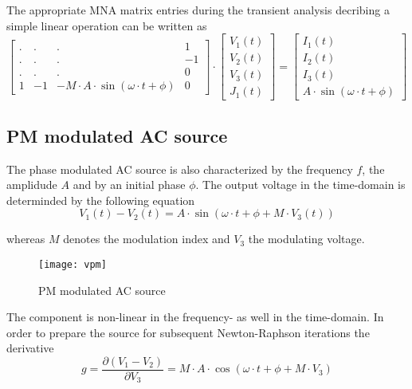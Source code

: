 The appropriate MNA matrix entries during the transient analysis
decribing a simple linear operation can be written as
\begin{equation}
\begin{bmatrix}
. & . & . & 1\\
. & . & . & -1\\
. & . & . & 0\\
1 & -1 & -M\cdot A\cdot \sin{\left(\omega\cdot t + \phi\right)} & 0
\end{bmatrix}
\cdot
\begin{bmatrix}
V_1\left(t\right)\\
V_2\left(t\right)\\
V_3\left(t\right)\\
J_1\left(t\right)
\end{bmatrix}
=
\begin{bmatrix}
I_1\left(t\right)\\
I_2\left(t\right)\\
I_3\left(t\right)\\
A\cdot \sin{\left(\omega\cdot t + \phi\right)}
\end{bmatrix}
\end{equation}

\subsection{PM modulated AC source}

The phase modulated AC source is also characterized by the frequency
$f$, the amplidude $A$ and by an initial phase $\phi$.  The output
voltage in the time-domain is determinded by the following equation
\begin{equation}
V_1\left(t\right) - V_2\left(t\right) = A\cdot\sin{\left(\omega\cdot t + \phi + M\cdot V_3\left(t\right)\right)}
\end{equation}

whereas $M$ denotes the modulation index and $V_3$ the modulating
voltage.

\begin{figure}[ht]
\begin{center}
\texttt{[image: vpm]}
\end{center}
\label{fig:VPM}
\caption{PM modulated AC source}
\end{figure}
\FloatBarrier

The component is non-linear in the frequency- as well in the
time-domain.  In order to prepare the source for subsequent
Newton-Raphson iterations the derivative
\begin{equation}
g = \dfrac{\partial \left(V_1 - V_2\right)}{\partial V_3} = M\cdot A\cdot\cos{\left(\omega\cdot t + \phi + M\cdot V_3\right)}
\end{equation}

